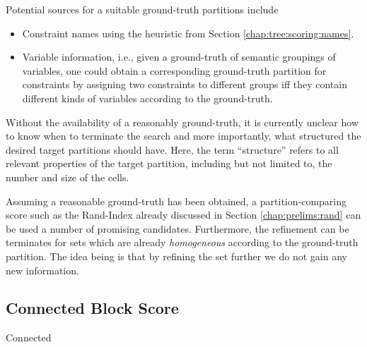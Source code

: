 			Potential sources for a suitable ground-truth partitions include
			\begin{itemize}
				\item Constraint names using the heuristic from Section \ref{chap:tree:scoring:names}. 
				\item Variable information, i.e., given a ground-truth of semantic groupings of variables, one could obtain a corresponding ground-truth partition for constraints by assigning two constraints to different groups iff they contain different kinds of variables according to the ground-truth.
			\end{itemize}
			
			Without the availability of a reasonably ground-truth, it is currently unclear how to know when to terminate the search and more importantly, what structured the desired target partitions should have.
			Here, the term \enquote{structure} refers to all relevant properties of the target partition, including but not limited to, the number and size of the cells.
			
			Assuming a reasonable ground-truth has been obtained, a partition-comparing score such as the Rand-Index already discussed in Section \ref{chap:prelims:rand} can be used a number of promising candidates.
			Furthermore, the refinement can be terminates for sets which are already \textit{homogeneous} according to the ground-truth partition.
			The idea being is that by refining the set further we do not gain any new information.
			
			\clearpage
	
		\subsection{Connected Block Score}
	
			Connected

			\clearpage
